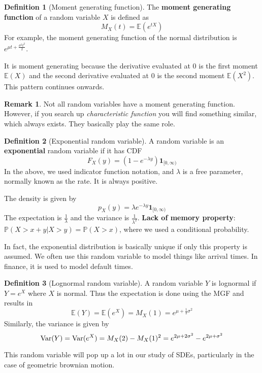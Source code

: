 \documentclass{article}
\numberwithin{equation}{section}
\theoremstyle{definition}
\newtheorem{definition}{Definition}[section]
\newtheorem{remark}{Remark}[theorem]
\newcommand{\pr}{\mathbb{P}}
\newcommand{\E}{\mathbb{E}}
\newcommand{\V}{\textup{Var}}
\newcommand{\ind}{\mathbf{1}}
\begin{document}
\begin{definition}[Moment generating function]
    The \textbf{moment generating function} of a random variable $X$ is defined as
    \begin{equation}
        M_X(t) = \E(e^{tX})
    \end{equation}
    For example, the moment generating function of the normal distribution is $e^{\mu t + \frac{\sigma^2 t^2}{2}}$.
\end{definition}
It is moment generating because the derivative evaluated at $0$ is the first moment $\E(X)$ and the second derivative evaluated at $0$ is the second moment $\E(X^2)$. This pattern continues onwards.
\begin{remark}
    Not all random variables have a moment generating function. However, if you search up \textit{characteristic function} you will find something similar, which always exists. They basically play the same role.
\end{remark}
\begin{definition}[Exponential random variable]
    A random variable is an \textbf{exponential} random variable if it has CDF
    \begin{equation}
        F_X(y) = (1 - e^{-\lambda y}) \ind_{[0, \infty)}
    \end{equation}
    In the above, we used indicator function notation, and $\lambda$ is a free parameter, normally known as the rate. It is always positive.

    The density is given by
    \begin{equation}
        p_X(y) = \lambda e^{-\lambda y} \ind_{[0, \infty)}
    \end{equation}
    The expectation is $\frac{1}{\lambda}$ and the variance is $\frac{1}{\lambda^2}$.
    \textbf{Lack of memory property}: $\pr(X > x+y | X>y) = \pr(X>x)$, where we used a conditional probability.
\end{definition}
In fact, the exponential distribution is basically unique if only this property is assumed. We often use this random variable to model things like arrival times. In finance, it is used to model default times.

\begin{definition}[Lognormal random variable]
    A random variable $Y$ is lognormal if $Y = e^X$ where $X$ is normal. Thus the expectation is done using the MGF and results in
    \begin{equation}
        \E(Y) = \E(e^X) = M_X(1) = e^{\mu + \frac{1}{2}\sigma^2}
    \end{equation}
    Similarly, the variance is given by
    \begin{equation}
        \V(Y) = \V(e^X) = M_X(2) - M_X(1)^2 = e^{2\mu + 2\sigma^2} - e^{2\mu + \sigma^2}
    \end{equation}
\end{definition}
This random variable will pop up a lot in our study of SDEs, particularly in the case of geometric brownian motion.
\end{document}

